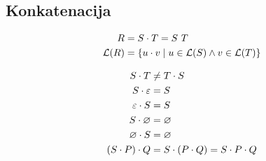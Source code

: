 \documentclass{report}
\newcounter{example}
\newcommand{\Reset}{\setcounter{example}{1}}
\newcommand{\Empty}{\varnothing}
\newcommand{\Null}{\varepsilon}
\newcommand{\Language}[1]{\mathcal{L}(#1)}
\newcommand{\Automaton}[1]{\mathcal{M}(#1)}
\newcommand{\Char}[1]{\texttt{#1}}
\newcommand{\Seq}{\cdot}
\newcommand{\Pos}{\mathop{\mdsmblkcircle}}
\newcommand{\Spc}{\ }
\newcommand{\Set}[1]{\symbf{#1}}
\newlength{\arrow}
\newcommand{\MoveX}[1]{\xrightarrow{\mathmakebox[\arrow]{#1}}}
\newcommand{\RE}[1]{{\uppercase{#1}}}
\begin{document}
%

\subsection{Konkatenacija}
\Reset

\begin{tcolorbox}[title={Definicija}]
\begin{equation*}
  \begin{aligned}
    \RE{r} &= \RE{s} \Seq \RE{t} = \RE{s} \Spc \RE{t}\\
    \Language{\RE{r}} &= \{ u \Seq v \mid u \in \Language{\RE{s}} \land v \in \Language{\RE{t}}\}
  \end{aligned}
\end{equation*}
\end{tcolorbox}

\begin{tcolorbox}[title={Pravila}]
\begin{equation*}
  \begin{aligned}
    \RE{s} \Seq \RE{t} &\not= \RE{t} \Seq \RE{s}\\
    \RE{s} \Seq \Null &= \RE{s} \\
    \Null \Seq \RE{s} &= \RE{s} \\
    \RE{s} \Seq \Empty &= \Empty \\
    \Empty \Seq \RE{s} &= \Empty \\
    (\RE{s} \Seq \RE{p}) \Seq \RE{q} &= \RE{s} \Seq (\RE{p} \Seq \RE{q}) = \RE{s} \Seq \RE{p} \Seq \RE{q}
  \end{aligned}
\end{equation*}
\end{tcolorbox}
\end{document}
